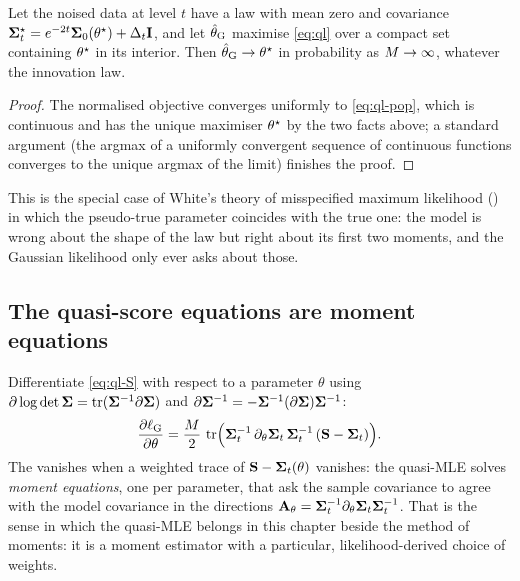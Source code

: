 \begin{proposition}
\label{prop:qmle}
Let the noised data at level $t$ have a law with mean zero and covariance
$\mathbf{\Sigma}_t^\star=e^{-2t}\mathbf{\Sigma}_0(\theta^\star)+\Delta_t\mathbf{I}$, and let $\hat{\theta}_{\mathrm G}$
maximise \cref{eq:ql} over a compact set containing $\theta^\star$ in its interior. Then
$\hat{\theta}_{\mathrm G}\to\theta^\star$ in probability as $M\to\infty$, whatever the
innovation law.
\end{proposition}
\begin{proof}
The normalised objective converges uniformly to \cref{eq:ql-pop}, which is continuous
and has the unique maximiser $\theta^\star$ by the two facts above; a standard
argument (the argmax of a uniformly convergent sequence of continuous functions converges
to the unique argmax of the limit) finishes the proof.
\end{proof}

This is the special case of White's theory of misspecified maximum likelihood
() in which the pseudo-true parameter coincides with
the true one: the model is wrong about the shape of the law but right about its first two
moments, and the Gaussian likelihood only ever asks about those.

\subsection{The quasi-score equations are moment equations}

Differentiate \cref{eq:ql-S} with respect to a parameter $\theta$ using
$\partial\log\det\mathbf{\Sigma}=\operatorname{tr}(\mathbf{\Sigma}^{-1}\partial\mathbf{\Sigma})$ and
$\partial\mathbf{\Sigma}^{-1}=-\mathbf{\Sigma}^{-1}(\partial\mathbf{\Sigma})\mathbf{\Sigma}^{-1}$:
\begin{equation}
  \frac{\partial\ell_{\mathrm G}}{\partial\theta}
  =\frac{M}{2}\,\operatorname{tr}\Bigl(\mathbf{\Sigma}_t^{-1}\,\partial_\theta\mathbf{\Sigma}_t\,\mathbf{\Sigma}_t^{-1}\,(\mathbf{S}-\mathbf{\Sigma}_t)\Bigr).
  \label{eq:quasi-score}
\end{equation}
The  vanishes when a weighted trace of $\mathbf{S}-\mathbf{\Sigma}_t(\theta)$
vanishes: the quasi-MLE solves \emph{moment equations}, one per parameter, that ask the
sample covariance to agree with the model covariance in the directions
$\mathbf{A}_\theta=\mathbf{\Sigma}_t^{-1}\partial_\theta\mathbf{\Sigma}_t\mathbf{\Sigma}_t^{-1}$. That is the sense in which
the quasi-MLE belongs in this chapter beside the method of moments: it is a moment
estimator with a particular, likelihood-derived choice of weights.

